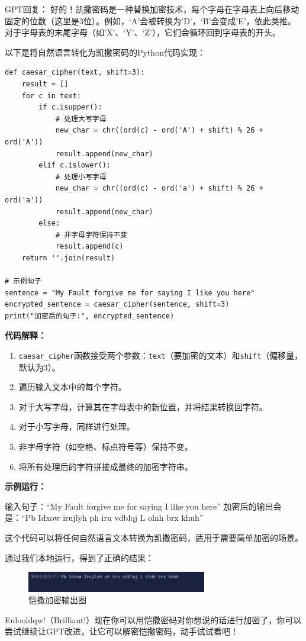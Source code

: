 GPT回复：
好的！凯撒密码是一种替换加密技术，每个字母在字母表上向后移动固定的位数（这里是3位）。例如，`A'会被转换为'D'，`B'会变成'E'，依此类推。对于字母表的末尾字母（如'X'、`Y'、`Z'），它们会循环回到字母表的开头。

以下是将自然语言转化为凯撒密码的Python代码实现：

\begin{lstlisting}
def caesar_cipher(text, shift=3):
    result = []
    for c in text:
        if c.isupper():
            # 处理大写字母
            new_char = chr((ord(c) - ord('A') + shift) % 26 + ord('A'))
            result.append(new_char)
        elif c.islower():
            # 处理小写字母
            new_char = chr((ord(c) - ord('a') + shift) % 26 + ord('a'))
            result.append(new_char)
        else:
            # 非字母字符保持不变
            result.append(c)
    return ''.join(result)

# 示例句子
sentence = "My Fault forgive me for saying I like you here"
encrypted_sentence = caesar_cipher(sentence, shift=3)
print("加密后的句子:", encrypted_sentence)
\end{lstlisting}

\textbf{代码解释：}

\begin{enumerate}
  \def\labelenumi{\arabic{enumi}.}

  \item
        \texttt{caesar\_cipher}函数接受两个参数：\texttt{text}（要加密的文本）和\texttt{shift}（偏移量，默认为3）。
  \item
        遍历输入文本中的每个字符。
  \item
        对于大写字母，计算其在字母表中的新位置，并将结果转换回字符。
  \item
        对于小写字母，同样进行处理。
  \item
        非字母字符（如空格、标点符号等）保持不变。
  \item
        将所有处理后的字符拼接成最终的加密字符串。
\end{enumerate}

\textbf{示例运行：}

输入句子：``My Fault forgive me for saying I like you here''
加密后的输出会是：``Pb Idxow irujlyh ph iru vdblqj L olnh brx khuh''

这个代码可以将任何自然语言文本转换为凯撒密码，适用于需要简单加密的场景。

通过我们本地运行，得到了正确的结果：

\centering
\begin{figure}[H] %
  \centering %
  \includegraphics[width=0.7\textwidth]{assets/figures/image-20250210173814654.png} %
  \caption{恺撒加密输出图} %
  \label{Fig.main1} %
\end{figure}%

Eulooldqw!（Brilliant!）现在你可以用恺撒密码对你想说的话进行加密了，你可以尝试继续让GPT改进，让它可以解密恺撒密码，动手试试看吧！